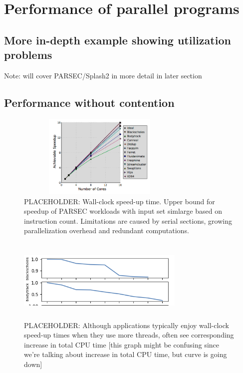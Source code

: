 \section{Performance of parallel programs}

\subsection{More in-depth example showing utilization problems}

Note: will cover PARSEC/Splash2 in more detail in later section \cite{bienia2011benchmarking} \cite{bienia2008parsec} \cite{bienia2012characteristics}

\subsection{Performance without contention}

\begin{figure}
\centering
  \includegraphics[width=8cm,height=4cm]{fig/speed-up.png}
  \caption{PLACEHOLDER: Wall-clock speed-up time. Upper bound for speedup of PARSEC workloads with input set simlarge based on instruction count. Limitations are caused by serial sections, growing parallelization overhead and redundant computations.}
  \label{fig:speed-up}
\end{figure}

\begin{figure}
\centering
  \includegraphics[width=8cm,height=4cm]{fig/slow-down.png}
  \caption{PLACEHOLDER: Although applications typically enjoy wall-clock speed-up times when they use more threads, often see corresponding increase in total CPU time [this graph might be confusing since we're talking about increase in total CPU time, but curve is going down]}
  \label{fig:slow-down}
\end{figure}


